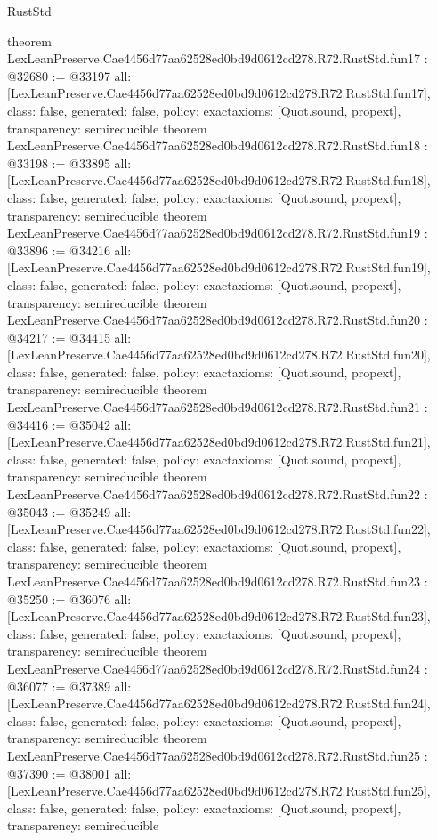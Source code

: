 \begin{lexlean}{RustStd}
\begin{coremodule}
{}
theorem LexLeanPreserve.Cae4456d77aa62528ed0bd9d0612cd278.R72.RustStd.fun17 : @32680 := @33197 {
  all: [LexLeanPreserve.Cae4456d77aa62528ed0bd9d0612cd278.R72.RustStd.fun17],
  class: false,
  generated: false,
  policy: exact{axioms: [Quot.sound, propext]},
  transparency: semireducible
}
theorem LexLeanPreserve.Cae4456d77aa62528ed0bd9d0612cd278.R72.RustStd.fun18 : @33198 := @33895 {
  all: [LexLeanPreserve.Cae4456d77aa62528ed0bd9d0612cd278.R72.RustStd.fun18],
  class: false,
  generated: false,
  policy: exact{axioms: [Quot.sound, propext]},
  transparency: semireducible
}
theorem LexLeanPreserve.Cae4456d77aa62528ed0bd9d0612cd278.R72.RustStd.fun19 : @33896 := @34216 {
  all: [LexLeanPreserve.Cae4456d77aa62528ed0bd9d0612cd278.R72.RustStd.fun19],
  class: false,
  generated: false,
  policy: exact{axioms: [Quot.sound, propext]},
  transparency: semireducible
}
theorem LexLeanPreserve.Cae4456d77aa62528ed0bd9d0612cd278.R72.RustStd.fun20 : @34217 := @34415 {
  all: [LexLeanPreserve.Cae4456d77aa62528ed0bd9d0612cd278.R72.RustStd.fun20],
  class: false,
  generated: false,
  policy: exact{axioms: [Quot.sound, propext]},
  transparency: semireducible
}
theorem LexLeanPreserve.Cae4456d77aa62528ed0bd9d0612cd278.R72.RustStd.fun21 : @34416 := @35042 {
  all: [LexLeanPreserve.Cae4456d77aa62528ed0bd9d0612cd278.R72.RustStd.fun21],
  class: false,
  generated: false,
  policy: exact{axioms: [Quot.sound, propext]},
  transparency: semireducible
}
theorem LexLeanPreserve.Cae4456d77aa62528ed0bd9d0612cd278.R72.RustStd.fun22 : @35043 := @35249 {
  all: [LexLeanPreserve.Cae4456d77aa62528ed0bd9d0612cd278.R72.RustStd.fun22],
  class: false,
  generated: false,
  policy: exact{axioms: [Quot.sound, propext]},
  transparency: semireducible
}
theorem LexLeanPreserve.Cae4456d77aa62528ed0bd9d0612cd278.R72.RustStd.fun23 : @35250 := @36076 {
  all: [LexLeanPreserve.Cae4456d77aa62528ed0bd9d0612cd278.R72.RustStd.fun23],
  class: false,
  generated: false,
  policy: exact{axioms: [Quot.sound, propext]},
  transparency: semireducible
}
theorem LexLeanPreserve.Cae4456d77aa62528ed0bd9d0612cd278.R72.RustStd.fun24 : @36077 := @37389 {
  all: [LexLeanPreserve.Cae4456d77aa62528ed0bd9d0612cd278.R72.RustStd.fun24],
  class: false,
  generated: false,
  policy: exact{axioms: [Quot.sound, propext]},
  transparency: semireducible
}
theorem LexLeanPreserve.Cae4456d77aa62528ed0bd9d0612cd278.R72.RustStd.fun25 : @37390 := @38001 {
  all: [LexLeanPreserve.Cae4456d77aa62528ed0bd9d0612cd278.R72.RustStd.fun25],
  class: false,
  generated: false,
  policy: exact{axioms: [Quot.sound, propext]},
  transparency: semireducible
}
\end{coremodule}
\end{lexlean}
